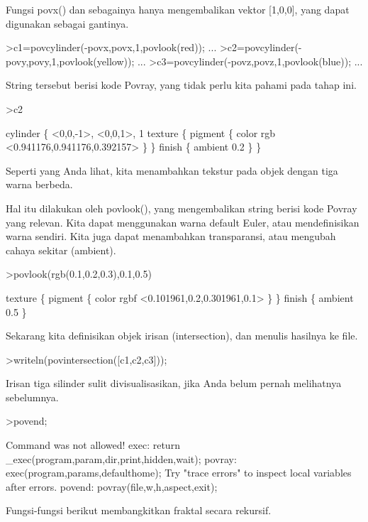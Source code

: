 \documentclass[a4paper,10pt]{article}
\begin{document}
\begin{eulernotebook}
\begin{eulercomment}
Fungsi povx() dan sebagainya hanya mengembalikan vektor [1,0,0], yang dapat digunakan sebagai gantinya.
\end{eulercomment}
\begin{eulerprompt}
>c1=povcylinder(-povx,povx,1,povlook(red)); ...
>c2=povcylinder(-povy,povy,1,povlook(yellow)); ...
>c3=povcylinder(-povz,povz,1,povlook(blue)); ...
\end{eulerprompt}
\begin{eulercomment}
String tersebut berisi kode Povray, yang tidak perlu kita pahami pada tahap ini.
\end{eulercomment}
\begin{eulerprompt}
>c2
\end{eulerprompt}
\begin{euleroutput}
  cylinder \{ <0,0,-1>, <0,0,1>, 1
   texture \{ pigment \{ color rgb <0.941176,0.941176,0.392157> \}  \} 
   finish \{ ambient 0.2 \} 
   \}
\end{euleroutput}
\begin{eulercomment}
Seperti yang Anda lihat, kita menambahkan tekstur pada objek dengan tiga warna berbeda.

Hal itu dilakukan oleh povlook(), yang mengembalikan string berisi kode Povray yang relevan. Kita dapat menggunakan
warna default Euler, atau mendefinisikan warna sendiri. Kita juga dapat menambahkan transparansi, atau mengubah
cahaya sekitar (ambient).
\end{eulercomment}
\begin{eulerprompt}
>povlook(rgb(0.1,0.2,0.3),0.1,0.5)
\end{eulerprompt}
\begin{euleroutput}
   texture \{ pigment \{ color rgbf <0.101961,0.2,0.301961,0.1> \}  \} 
   finish \{ ambient 0.5 \} 
  
\end{euleroutput}
\begin{eulercomment}
Sekarang kita definisikan objek irisan (intersection), dan menulis hasilnya ke file.
\end{eulercomment}
\begin{eulerprompt}
>writeln(povintersection([c1,c2,c3]));
\end{eulerprompt}
\begin{eulercomment}
Irisan tiga silinder sulit divisualisasikan, jika Anda belum pernah melihatnya sebelumnya.
\end{eulercomment}
\begin{eulerprompt}
>povend;
\end{eulerprompt}
\begin{euleroutput}
  Command was not allowed!
  exec:
      return _exec(program,param,dir,print,hidden,wait);
  povray:
      exec(program,params,defaulthome);
  Try "trace errors" to inspect local variables after errors.
  povend:
      povray(file,w,h,aspect,exit); 
\end{euleroutput}
\begin{eulercomment}
Fungsi-fungsi berikut membangkitkan fraktal secara rekursif.


\end{eulercomment}
\end{eulernotebook}
\end{document}

